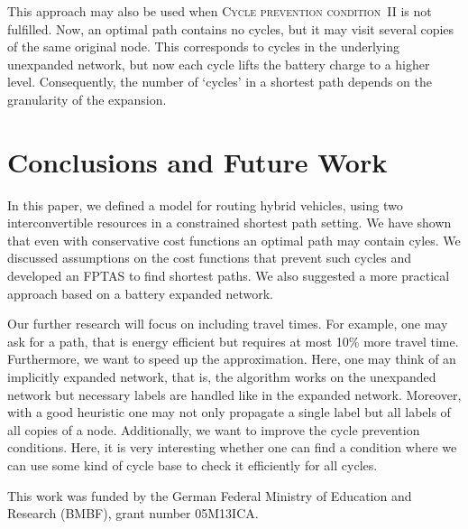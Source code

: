 \documentclass[a4paper]{scrartcl}
\begin{document}
This approach may also be used when \textsc{Cycle prevention condition~II} is not fulfilled. Now, an optimal path contains no cycles, but it may visit several copies of the same original node. This corresponds to cycles in the underlying unexpanded network, but now each cycle lifts the battery charge to a higher level. Consequently, the number of `cycles' in a shortest path depends on the granularity of the expansion.

\section{Conclusions and Future Work}

In this paper, we defined a model for routing hybrid vehicles, using two interconvertible resources in a constrained shortest path setting. We have shown that even with conservative cost functions an optimal path may contain cyles. We discussed assumptions on the cost functions that prevent such cycles and developed an FPTAS to find shortest paths. We also suggested a more practical approach based on a battery expanded network.

Our further research will focus on including travel times. For example, one may ask for a path, that is energy efficient but requires at most 10\% more travel time. Furthermore, we want to speed up the approximation. Here, one may think of an implicitly expanded network, that is, the algorithm works on the unexpanded network but necessary labels are handled like in the expanded network. Moreover, with a good heuristic one may not only propagate a single label but all labels of all copies of a node. Additionally, we want to improve the cycle prevention conditions. Here, it is very interesting whether one can find a condition where we can use some kind of cycle base to check it efficiently for all cycles.

This work was funded by the German Federal Ministry of Education and Research (BMBF), grant number 05M13ICA.

\appendix

\end{document}
